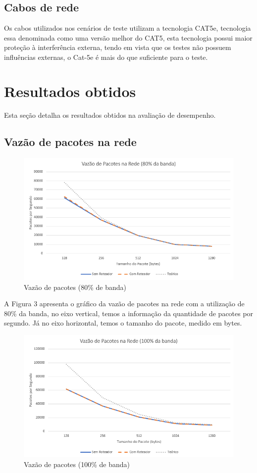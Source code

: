 \documentclass[12pt]{article}
\begin{document}
\subsection{Cabos de rede}

Os cabos utilizados nos cenários de teste utilizam a tecnologia CAT5e, tecnologia essa denominada como uma versão melhor do CAT5, esta tecnologia possui maior proteção à interferência externa, tendo em vista que os testes não possuem influências externas, o Cat-5e é mais do que suficiente para o teste.

\section{Resultados obtidos}

Esta seção detalha os resultados obtidos na avaliação de desempenho.

\subsection{Vazão de pacotes na rede}

\begin{figure}[H]
\centering
\includegraphics[width=.9\textwidth]{vazao_pac_80.png}
\caption{Vazão de pacotes (80\% de banda)}
\label{fig:fig_com_roteador}
\end{figure}

A Figura 3 apresenta o gráfico da vazão de pacotes na rede com a utilização de 80\% da banda, no eixo vertical, temos a informação da quantidade de pacotes por segundo. Já no eixo horizontal, temos o tamanho do pacote, medido em bytes.

\begin{figure}[H]
\centering
\includegraphics[width=.9\textwidth]{vazao_pac_100.png}
\caption{Vazão de pacotes (100\% de banda)}
\label{fig:fig_com_roteador}
\end{figure}
\end{document}
